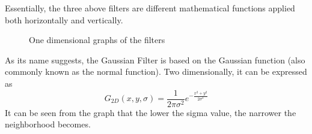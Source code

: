 \documentclass[twoside,a4paper,article]{combine}
\begin{document}
Essentially, the three above filters are different mathematical functions applied both horizontally and vertically.\\
\begin{minipage}{\textwidth}\begin{figure}[H]
    \centering
    \caption{One dimensional graphs of the filters}
    \label{fig:graph}
\end{figure}\end{minipage}
As its name suggests, the Gaussian Filter is based on the Gaussian function (also commonly known as the normal function).
Two dimensionally, it can be expressed as \cite{MISRA2020289}
\[
    G_{2D}(x, y, \sigma) = \frac{1}{2\pi\sigma^2}e^{-\frac{x^2 + y^2}{2\sigma^2}}
\]
It can be seen from the graph that the lower the sigma value, the narrower the neighborhood becomes. 
\end{document}
